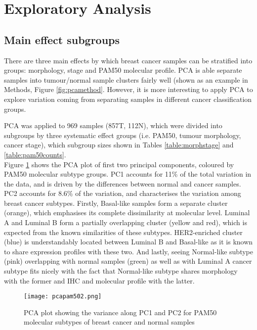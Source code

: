     
\section{Exploratory Analysis}


    \subsection{Main effect subgroups}

    There are three main effects by which breast cancer samples can be stratified into groups: morphology, stage and PAM50 molecular profile. PCA is able separate samples into tumour/normal sample clusters fairly well (shown as an example in Methods, Figure \ref{fig:pcamethod}. However, it is more interesting to apply PCA to explore variation coming from separating samples in different cancer classification groups.  
    
    PCA was applied to 969 samples (857T, 112N), which were divided into subgroups by three systematic effect groups (i.e. PAM50, tumour morphology, cancer stage), which subgroup sizes shown in Tables \ref{table:morphstage} and \ref{table:pam50counts}. \\
    Figure \ref{fig:pcapam50} shows the PCA plot of first two principal components, coloured by PAM50 molecular subtype groups. PC1 accounts for 11\% of the total variation in the data, and is driven by the differences between normal and cancer samples. PC2 accounts for 8.6\% of the variation, and characterises the variation among breast cancer subtypes. Firstly, Basal-like samples form a separate cluster (orange), which emphasises its complete dissimilarity at molecular level. Luminal A and Luminal B form a partially overlapping cluster (yellow and red), which is expected from the known similarities of these subtypes. HER2-enriched cluster (blue) is understandably located between Luminal B and Basal-like as it is known to share expression profiles with these two. And lastly, seeing Normal-like subtype (pink) overlapping with normal samples (green) as well as with Luminal A cancer subtype fits nicely with the fact that Normal-like subtype shares morphology with the former and IHC and molecular profile with the latter.    
    
            \begin{figure}[!h]
            \centering
            \texttt{[image: pcapam502.png]} 
            \caption{PCA plot showing the variance along PC1 and PC2 for PAM50 molecular subtypes of breast cancer and normal samples}
            \label{fig:pcapam50}
            \end{figure}
            
